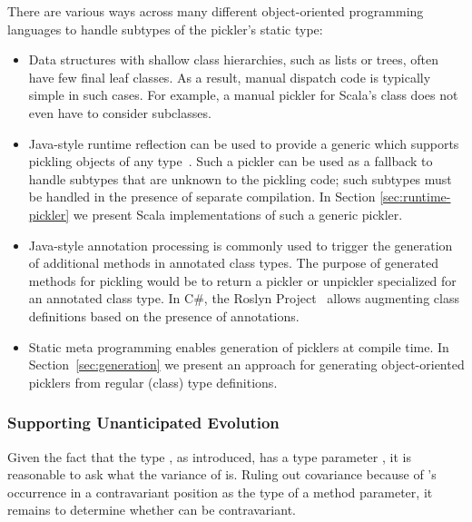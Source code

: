 There are various ways across many different object-oriented programming
languages to handle subtypes of the pickler's static type:

\begin{itemize}
\item Data structures with shallow class hierarchies, such as lists or trees,
often have few final leaf classes. As a result, manual dispatch code is
typically simple in such cases. For example, a manual pickler for Scala's
 class does not even have to consider subclasses.

\item Java-style runtime reflection can be used to provide a generic
 which supports pickling objects of any
type~\cite{JavaSerialization,Philippsen2000}. Such a pickler can be used as a
fallback to handle subtypes that are unknown to the pickling code; such
subtypes must be handled in the presence of separate compilation. In
Section \ref{sec:runtime-pickler} we present Scala implementations of such a
generic pickler.

\item Java-style annotation processing is commonly used to trigger the
generation of additional methods in annotated class types. The purpose of
generated methods for pickling would be to return a pickler or unpickler
specialized for an annotated class type. In C\#, the Roslyn
Project~\cite{Roslyn} allows augmenting class definitions based on the
presence of annotations.

\item Static meta programming \cite{Burmako2012,Nemerle} enables generation of
picklers at compile time. In Section~\ref{sec:generation} we present an
approach for generating object-oriented picklers from regular (class) type
definitions.
\end{itemize}


\subsubsection{Supporting Unanticipated Evolution}\label{sec:unanticipated}

Given the fact that the type , as introduced, has a type
parameter , it is reasonable to ask what the variance of  is. Ruling out
covariance because of 's occurrence in a contravariant position as the type
of a method parameter, it remains to determine whether  can be
contravariant.

